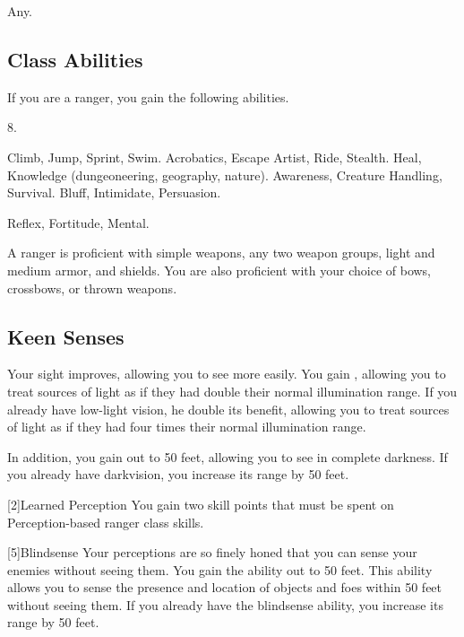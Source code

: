      Any.

    \subsection{Class Abilities}
        If you are a ranger, you gain the following abilities.

         8.

         Climb, Jump, Sprint, Swim.
         Acrobatics, Escape Artist, Ride, Stealth.
         Heal, Knowledge (dungeoneering, geography, nature).
         Awareness, Creature Handling, Survival.
         Bluff, Intimidate, Persuasion.

          Reflex,  Fortitude,  Mental.

        A ranger is proficient with simple weapons, any two weapon groups, light and medium armor, and shields.
        You are also proficient with your choice of bows, crossbows, or thrown weapons.

        \subsection{Keen Senses}
            Your sight improves, allowing you to see more easily.
            You gain , allowing you to treat sources of light as if they had double their normal illumination range.
            If you already have low-light vision, he double its benefit, allowing you to treat sources of light as if they had four times their normal illumination range.

            In addition, you gain  out to 50 feet, allowing you to see in complete darkness.
            If you already have darkvision, you increase its range by 50 feet.

            [2]{Learned Perception} You gain two skill points that must be spent on Perception-based ranger class skills.

            [5]{Blindsense}
            Your perceptions are so finely honed that you can sense your enemies without seeing them.
            You gain the  ability out to 50 feet.
            This ability allows you to sense the presence and location of objects and foes within 50 feet without seeing them.
            If you already have the blindsense ability, you increase its range by 50 feet.

